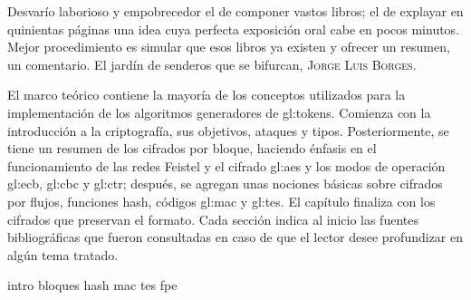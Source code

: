 %
%

{
  \epigrafe
  {%
    Desvarío laborioso y empobrecedor el de componer vastos libros; el de
    explayar en quinientas páginas una idea cuya perfecta exposición oral cabe
    en pocos minutos. Mejor procedimiento es simular que esos libros ya existen
    y ofrecer un resumen, un comentario.%
  }
  {%
    El jardín de senderos que se bifurcan,
    \textsc{Jorge Luis Borges}.%
  }
}

\noindent
El marco teórico contiene la mayoría de los conceptos utilizados para la
implementación de los algoritmos generadores de \glspl{gl:token}. Comienza con
la introducción a la criptografía, sus objetivos, ataques y tipos.
Posteriormente, se tiene un resumen de los cifrados por bloque, haciendo énfasis
en el funcionamiento de las redes Feistel y el cifrado \gls{gl:aes} y los modos
de operación \gls{gl:ecb}, \gls{gl:cbc} y \gls{gl:ctr}; después, se agregan unas
nociones básicas sobre cifrados por flujos, funciones hash, códigos
\gls{gl:mac} y \gls{gl:tes}. El capítulo finaliza con los cifrados que preservan
el formato. Cada sección indica al inicio las fuentes bibliográficas que fueron
consultadas en caso de que el lector desee profundizar en algún tema tratado.

{intro}
{bloques}
{hash}
{mac}
{tes}
{fpe}
